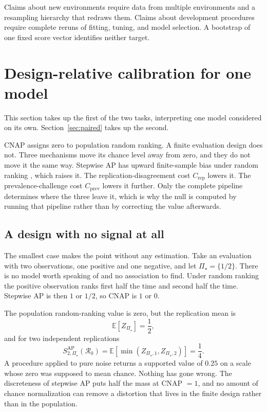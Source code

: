 \documentclass[11pt]{article}
\newcommand{\Regime}{\mathcal{R}}
\newcommand{\PSet}{\Pi_\star}
\newcommand{\E}{\mathbb{E}}
\theoremstyle{remark}
\begin{document}
Claims about new environments require data from multiple environments and a resampling hierarchy that redraws them. Claims about development procedures require complete reruns of fitting, tuning, and model selection. A bootstrap of one fixed score vector identifies neither target.

\section{Design-relative calibration for one model}
\label{sec:calibration}

This section takes up the first of the two tasks, interpreting one model considered on its own. Section~\ref{sec:paired} takes up the second.

CNAP assigns zero to population random ranking. A finite evaluation design does not. Three mechanisms move its chance level away from zero, and they do not move it the same way. Stepwise AP has upward finite-sample bias under random ranking \cite{bestgen2015random}, which raises it. The replication-disagreement cost $C_{\mathrm{rep}}$ lowers it. The prevalence-challenge cost $C_{\mathrm{prev}}$ lowers it further. Only the complete pipeline determines where the three leave it, which is why the null is computed by running that pipeline rather than by correcting the value afterwards.

\subsection{A design with no signal at all}

The smallest case makes the point without any estimation. Take an evaluation with two observations, one positive and one negative, and let $\PSet=\{1/2\}$. There is no model worth speaking of and no association to find. Under random ranking the positive observation ranks first half the time and second half the time. Stepwise AP is then $1$ or $1/2$, so CNAP is $1$ or $0$.

The population random-ranking value is zero, but the replication mean is
\[
\E[Z_{\PSet}]
=
\frac12,
\]
and for two independent replications
\[
S_{2,\PSet}^{\mathrm{AP}}(\Regime_0)
=
\E[\min(Z_{\PSet,1},Z_{\PSet,2})]
=
\frac14.
\]
A procedure applied to pure noise returns a supported value of $0.25$ on a scale whose zero was supposed to mean chance. Nothing has gone wrong. The discreteness of stepwise AP puts half the mass at CNAP $=1$, and no amount of chance normalization can remove a distortion that lives in the finite design rather than in the population.
\end{document}
